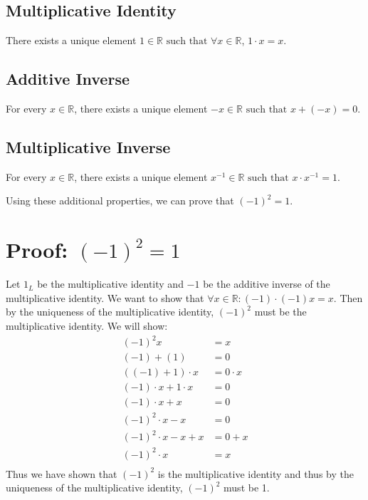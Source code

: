 \documentclass{article}
\begin{document}
\subsection{Multiplicative Identity}
There exists a unique element $1 \in \mathbb{R} \text{  such that } \forall x \in \mathbb{R}$, $1 \cdot x = x$.
\subsection{Additive Inverse}
For every $x \in \mathbb{R}$, there exists a unique element $-x \in \mathbb{R} \text{  such that } x + (-x) = 0$.

\subsection{Multiplicative Inverse}
For every $x \in \mathbb{R}$, there exists a unique element $x^{-1} \in \mathbb{R} \text{  such that } x \cdot x^{-1} = 1$.

Using these additional properties, we can prove that $(-1)^2 = 1$.
\section{Proof: $(-1)^2 = 1$}
\begin{proofbox}
Let $1_L$ be the multiplicative identity and $-1$ be the additive inverse of the multiplicative identity. We want to show that $\forall x \in \mathbb{R} : (-1) \cdot (-1) x = x$. Then by the uniqueness of the multiplicative identity, $(-1)^2$ must be the multiplicative identity. We will show:
\begin{align*}
    (-1)^2x  &= x \\
    (-1) + (1) &= 0 \\ 
    ((-1) + 1) \cdot x &= 0\cdot x \\ 
    (-1) \cdot x + 1 \cdot x &= 0 \\ 
    (-1) \cdot x+ x &= 0 \\ 
    (-1)^2 \cdot x - x &= 0 \\ 
    (-1)^2 \cdot x -x + x&= 0 + x \\ 
    (-1)^2 \cdot x &= x \\
\end{align*}
Thus we have shown that $(-1)^2$ is the multiplicative identity and thus by the uniqueness of the multiplicative identity, $(-1)^2$ must be 1.
\end{proofbox}
\end{document}
